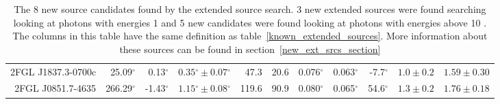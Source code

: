 \documentclass[12pt,preprint]{aastex}
\newcommand{\gev}{\text{GeV}\xspace}
\renewcommand{\deg}{\ensuremath{^\circ}\xspace}
\begin{document}
\begin{table}
\begin{centering}
\begin{tabular}{r|rrrrrrrrrr}
      2FGL J1837.3-0700c         &      25.09\deg &       0.13\deg & $  0.35\deg \pm   0.07\deg$ &     47.3 &       20.6 &  0.076\deg &  0.063\deg &   -7.7\deg & $    1.0 \pm     0.2$ & $   1.59 \pm    0.30$ \\
      2FGL J0851.7-4635          &     266.29\deg &      -1.43\deg & $  1.15\deg \pm   0.08\deg$ &    119.6 &       90.9 &  0.080\deg &  0.065\deg &   54.6\deg & $    1.3 \pm     0.2$ & $   1.76 \pm    0.18$ \\
      \hline
    \end{tabular}
    \caption{The 8 new source candidates found by the
    extended source search. 3 new extended sources were found searching looking at photons with energies 1 \gev and
    5 new candidates were found looking at photons with energies above 10 \gev.
    The columns in this table have the same definition as table~\ref{known_extended_sources}.
    More information about these sources can be found in section~\ref{new_ext_srcs_section}
    }
    \label{new_ext_srcs_table}
  \end{centering}
\end{table}
\end{document}

